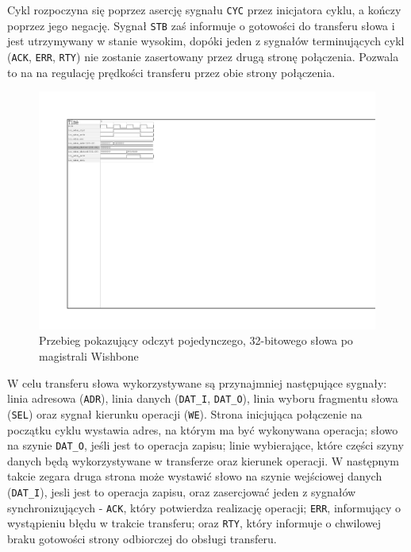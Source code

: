 Cykl rozpoczyna się poprzez asercję sygnału \texttt{CYC} przez inicjatora cyklu, a kończy poprzez jego negację. Sygnał \texttt{STB} zaś informuje o gotowości do transferu słowa i jest utrzymywany w stanie wysokim, dopóki jeden z sygnałów terminujących cykl (\texttt{ACK}, \texttt{ERR}, \texttt{RTY}) nie zostanie zasertowany przez drugą stronę połączenia. Pozwala to na na regulację prędkości transferu przez obie strony połączenia.

\begin{figure}[H]
    \centering
    \includegraphics[scale=1.5,trim={2.54cm 14.73cm 19.6cm 2.9cm},clip]{implementation/classic-read.pdf}
    \caption{Przebieg pokazujący odczyt pojedynczego, 32-bitowego słowa po magistrali Wishbone}
    \label{fig:wishbone-classic-read}
\end{figure}

W celu transferu słowa wykorzystywane są przynajmniej następujące sygnały: linia adresowa (\texttt{ADR}), linia danych (\texttt{DAT_I}, \texttt{DAT_O}), linia wyboru fragmentu słowa (\texttt{SEL}) oraz sygnał kierunku operacji (\texttt{WE}). Strona inicjująca połączenie na początku cyklu wystawia adres, na którym ma być wykonywana operacja; słowo na szynie \texttt{DAT_O}, jeśli jest to operacja zapisu; linie wybierające, które części szyny danych będą wykorzystywane w transferze oraz kierunek operacji. W następnym takcie zegara druga strona może wystawić słowo na szynie wejściowej danych (\texttt{DAT_I}), jesli jest to operacja zapisu, oraz zasercjować jeden z sygnałów synchronizujących - \texttt{ACK}, który potwierdza realizację operacji; \texttt{ERR}, informujący o wystąpieniu błędu w trakcie transferu; oraz \texttt{RTY}, który informuje o chwilowej braku gotowości strony odbiorczej do obsługi transferu.

